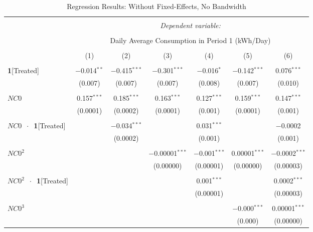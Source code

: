 \begin{table}[!htbp]
\centering 
\caption{Regression Results: Without Fixed-Effects, No Bandwidth} 
\label{Table:Regression-Results_Daily-Average_NA-BW-Without-FEs} 
\small
\begin{adjustbox}{scale = 0.8} 
\begin{tabular}{@{\extracolsep{25pt}}lcccccc} 
\\[-1.8ex]\hline 
\hline \\[-1.8ex] 
 & \multicolumn{6}{c}{\textit{Dependent variable:}} \\ 
\cline{2-7} 
\\[-1.8ex] & \multicolumn{6}{c}{Daily Average Consumption in Period 1 (kWh/Day)} \\ 
\\[-1.8ex] & (1) & (2) & (3) & (4) & (5) & (6)\\ 
\hline \\[-1.8ex] 
 \textbf{1}[Treated] & $-$0.014$^{**}$ & $-$0.415$^{***}$ & $-$0.301$^{***}$ & $-$0.016$^{*}$ & $-$0.142$^{***}$ & 0.076$^{***}$ \\ 
  & (0.007) & (0.007) & (0.007) & (0.008) & (0.007) & (0.010) \\ 
  & & & & & & \\ 
 $NC0$ & 0.157$^{***}$ & 0.185$^{***}$ & 0.163$^{***}$ & 0.127$^{***}$ & 0.159$^{***}$ & 0.147$^{***}$ \\ 
  & (0.0001) & (0.0002) & (0.0001) & (0.001) & (0.0001) & (0.001) \\ 
  & & & & & & \\ 
 $NC0$  $\ \cdot \ $ \textbf{1}[Treated] &  & $-$0.034$^{***}$ &  & 0.031$^{***}$ &  & $-$0.0002 \\ 
  &  & (0.0002) &  & (0.001) &  & (0.001) \\ 
  & & & & & & \\ 
 $NC0^{2}$ &  &  & $-$0.00001$^{***}$ & $-$0.001$^{***}$ & 0.00001$^{***}$ & $-$0.0002$^{***}$ \\ 
  &  &  & (0.00000) & (0.00001) & (0.00000) & (0.00003) \\ 
  & & & & & & \\ 
 $NC0^{2}$  $\ \cdot \ $ \textbf{1}[Treated] &  &  &  & 0.001$^{***}$ &  & 0.0002$^{***}$ \\ 
  &  &  &  & (0.00001) &  & (0.00003) \\ 
  & & & & & & \\ 
 $NC0^{3}$ &  &  &  &  & $-$0.000$^{***}$ & 0.00001$^{***}$ \\ 
  &  &  &  &  & (0.000) & (0.00000) \\ 

\end{tabular}
\end{adjustbox}
\end{table}
